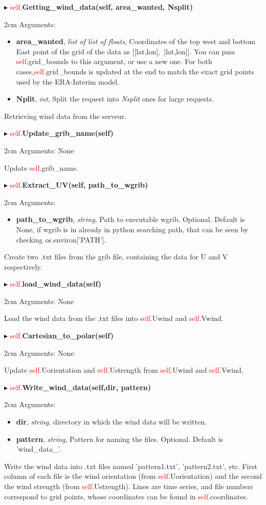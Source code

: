 \documentclass[12pt]{article}
\newenvironment{myenv}{\begin{adjustwidth}{2cm}{}}{\end{adjustwidth}}
\newcommand{\ClassFunction}[3]{\filbreak\noindent
$\blacktriangleright$ \quad \textcolor{red}{self}.\textbf{#1}

\begin{myenv}
Arguments: {#2}

{#3}
\end{myenv}
\vspace*{0.4 cm}}
\newcommand{\Argument}[3]{\noindent
\textbf{#1}, \textit{#2}, {#3}}
\begin{document}
\ClassFunction{Getting\_wind\_data(self, area\_wanted, Nsplit)}{
\begin{itemize}
	\item \Argument{area\_wanted}{list of list of floats}{Coordinates of the top west and bottom East point of the grid of the data as [[lat,lon],~[lat,lon]]. You can pass \textcolor{red}{self}.grid\_bounds to this argument, or use a new one. For both cases,\textcolor{red}{self}.grid\_bounds is updated at the end to match the exact grid points used by the ERA-Interim model.}
	\item \Argument{Nplit}{int}{Split the request into \textit{Nsplit} ones for large requests.}
\end{itemize}
}{Retrieving wind data from the serveur.}

\ClassFunction{Update\_grib\_name(self)}{None}{Update \textcolor{red}{self}.grib\_name.}

\ClassFunction{Extract\_UV(self, path\_to\_wgrib)}{
\begin{itemize}
\item \Argument{path\_to\_wgrib}{string}{Path to executable wgrib. Optional. Default is None, if wgrib is in already in python searching path, that can be seen by checking os.environ['PATH'].}
\end{itemize}
}{Create two .txt files from the grib file, containing the data for U and V respectively.}

\ClassFunction{load\_wind\_data(self)}{None}{Load the wind data from the .txt files into \textcolor{red}{self}.Uwind and \textcolor{red}{self}.Vwind.}

\ClassFunction{Cartesian\_to\_polar(self)}{None}{Update \textcolor{red}{self}.Uorientation and \textcolor{red}{self}.Ustrength from \textcolor{red}{self}.Uwind and \textcolor{red}{self}.Vwind.}

\ClassFunction{Write\_wind\_data(self,dir, pattern)}{
\begin{itemize}
	\item \Argument{dir}{string}{directory in which the wind data will be written.}
	\item \Argument{pattern}{string}{Pattern for naming the files. Optional. Default is 'wind\_data\_'.}
\end{itemize}
}{Write the wind data into .txt files named 'pattern1.txt', 'pattern2.txt', etc. First column of each file is the wind orientation (from \textcolor{red}{self}.Uorientation) and the second the wind strength (from \textcolor{red}{self}.Ustrength). Lines are time series, and file numbers correspond to grid points, whose coordinates can be found in \textcolor{red}{self}.coordinates.}
\end{document}

